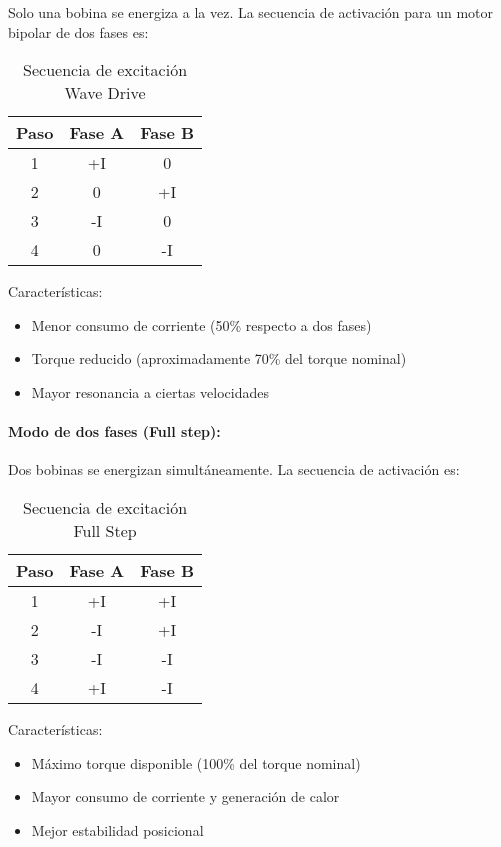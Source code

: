 Solo una bobina se energiza a la vez. La secuencia de activación para un motor bipolar de dos fases es:

\begin{table}[ht]
\centering
\begin{tabular}{|c|c|c|}
\hline
\textbf{Paso} & \textbf{Fase A} & \textbf{Fase B} \\
\hline
1 & +I & 0 \\
2 & 0 & +I \\
3 & -I & 0 \\
4 & 0 & -I \\
\hline
\end{tabular}
\caption{Secuencia de excitación Wave Drive}
\end{table}

Características:
\begin{itemize}
    \item Menor consumo de corriente (50\% respecto a dos fases)
    \item Torque reducido (aproximadamente 70\% del torque nominal)
    \item Mayor resonancia a ciertas velocidades
\end{itemize}

\paragraph{Modo de dos fases (Full step):}

Dos bobinas se energizan simultáneamente. La secuencia de activación es:

\begin{table}[ht]
\centering
\begin{tabular}{|c|c|c|}
\hline
\textbf{Paso} & \textbf{Fase A} & \textbf{Fase B} \\
\hline
1 & +I & +I \\
2 & -I & +I \\
3 & -I & -I \\
4 & +I & -I \\
\hline
\end{tabular}
\caption{Secuencia de excitación Full Step}
\end{table}

Características:
\begin{itemize}
    \item Máximo torque disponible (100\% del torque nominal)
    \item Mayor consumo de corriente y generación de calor
    \item Mejor estabilidad posicional
\end{itemize}

